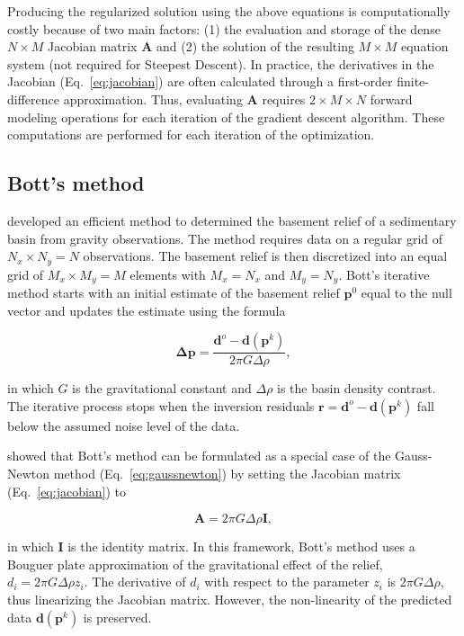 \documentclass[extra]{gji}
\begin{document}
Producing the regularized solution using the above equations is computationally
costly because of two main factors:
(1) the evaluation and storage of the dense $N \times M$ Jacobian matrix
$\mathbf{A}$
and (2) the solution of the resulting $M \times M$ equation system
(not required for Steepest Descent).
In practice, the derivatives in the Jacobian (Eq.~\ref{eq:jacobian})
are often calculated through a first-order finite-difference approximation.
Thus, evaluating $\mathbf{A}$ requires $2\times M \times N$ forward modeling
operations for each iteration of the gradient descent algorithm.
These computations are performed for each iteration of the optimization.


\subsection{Bott's method}

\citet{bott1960} developed an efficient method to determined the basement
relief of a sedimentary basin from gravity observations.
The method requires data on a regular grid of $N_x \times N_y = N$
observations.
The basement relief is then discretized into an equal grid of $M_x \times
M_y = M$ elements with $M_x = N_x$ and $M_y = N_y$.
Bott's iterative method starts with an initial estimate of the basement relief
$\mathbf{p}^0$ equal to the null vector and updates the estimate using the formula

\begin{equation}
    \mathbf{\Delta p} = \dfrac{\mathbf{d}^o - \mathbf{d}(\mathbf{p}^k)}{2\pi G \Delta \rho},
    \label{eq:bott}
\end{equation}

\noindent
in which $G$ is the gravitational constant and $\Delta \rho$ is the basin
density contrast.
The iterative process stops when the inversion residuals
$\mathbf{r} = \mathbf{d}^o - \mathbf{d}(\mathbf{p}^k)$ fall below the assumed noise level
of the data.

\citet{silva2014} showed that Bott's method can be formulated as
a special case of the Gauss-Newton method (Eq.~\ref{eq:gaussnewton})
by setting the Jacobian matrix (Eq.~\ref{eq:jacobian}) to

\begin{equation}
    \mathbf{A} = 2\pi G \Delta \rho \mathbf{I},
    \label{eq:bott-gaussnewton}
\end{equation}

\noindent
in which $\mathbf{I}$ is the identity matrix.
In this framework,
Bott's method uses a Bouguer plate approximation of the gravitational effect of
the relief, $d_i = 2\pi G \Delta\rho z_i$.
The derivative of $d_i$ with respect to the parameter $z_i$ is
$2\pi G \Delta \rho$, thus linearizing the Jacobian matrix.
However, the non-linearity of the predicted data $\mathbf{d}(\mathbf{p}^k)$ is
preserved.
\end{document}
